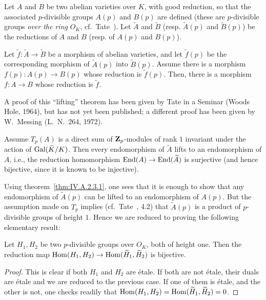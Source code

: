 
Let $A$ and $B$ be two abelian varieties over $K$, with good reduction,
so that the associated $p$-divisible groups $A(p)$ and $B(p)$ are defined
(these are $p$-divisible groups \emph{over the ring} $O_K$,
cf.~Tate~\cite{tate-pdiv}). Let $\widetilde{A}$ and $\widetilde{B}$
(resp. $\widetilde{A}(p)$ and $\widetilde{B}(p)$) be the reductions of
$A$ and $B$ (resp. of $A(p)$ and $B(p)$).

\begin{theorem}[1]\label{thm:IV.A.2.3.1}
Let $\widetilde{f}\colon \widetilde{A}\to\widetilde{B}$ be a morphism of
abelian varieties, and let $\widetilde{f}(p)$ be the corresponding
morphism of $\widetilde{A}(p)$ into $\widetilde{B}(p)$. Assume there is
a morphism $f(p)\colon A(p)\to B(p)$ whose reduction is
$\widetilde{f}(p)$. Then, there is a morphism
$f\colon A\to B$ whose reduction is $\widetilde{f}$.
\end{theorem}

A proof of this ``lifting'' theorem has been given by Tate in a Seminar
(Woods Hole, 1964), but has not yet been published; a different proof
has been given by W.~Messing (L.~N.~264, 1972).

\begin{theorem}[2]\label{thm:IV.A.2.3.2}
Assume $T_p(A)$ is a direct sum of $\mathbf{Z}_p$-modules of rank $1$ invariant
under the action of $\mathrm{Gal}(\bar K/K)$. Then every endomorphism of
$\widetilde{A}$ lifts to an endomorphism of $A$, i.e., the reduction
homomorphism $\mathrm{End}(A)\to\mathrm{End}(\widetilde{A})$ is surjective (and hence
bijective, since it is known to be injective).
\end{theorem}

Using theorem~\ref{thm:IV.A.2.3.1}, one sees that it is enough to show
that any endomorphism of $\widetilde{A}(p)$ can be lifted to an
endomorphism of $A(p)$. But the assumption made on $T_p$ implies
(cf.~Tate~\cite{tate-pdiv}, 4.2) that $\widetilde{A}(p)$ is a product of
$p$-divisible groups of height $1$. Hence we are reduced to proving the
following elementary result:

\begin{lemma}
Let $H_1, H_2$ be two $p$-divisible groups over $O_K$, both of height
one. Then the reduction map
$\mathrm{Hom}(H_1,H_2)\to\mathrm{Hom}(\widetilde{H}_1,\widetilde{H}_2)$ is bijective.
\end{lemma}

\begin{proof}
This is clear if both $H_1$ and $H_2$ are \'etale. If both are not
\'etale, their duals are \'etale and we are reduced to the previous
case. If one of them is \'etale, and the other is not, one checks
readily that
$\mathrm{Hom}(H_1,H_2)=\mathrm{Hom}(\widetilde{H}_1,\widetilde{H}_2)=0$.
\end{proof}

